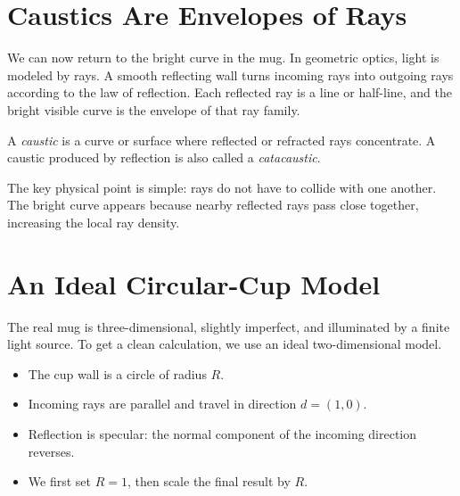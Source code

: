 \documentclass[11pt]{article}
\begin{document}
\section{Caustics Are Envelopes of Rays}

We can now return to the bright curve in the mug. In geometric optics, light is modeled by rays. A smooth reflecting wall turns incoming rays into outgoing rays according to the law of reflection. Each reflected ray is a line or half-line, and the bright visible curve is the envelope of that ray family.

\begin{definitionbox}[title=Caustic]
A \emph{caustic} is a curve or surface where reflected or refracted rays concentrate. A caustic produced by reflection is also called a \emph{catacaustic}.
\end{definitionbox}

The key physical point is simple: rays do not have to collide with one another. The bright curve appears because nearby reflected rays pass close together, increasing the local ray density.

\section{An Ideal Circular-Cup Model}

The real mug is three-dimensional, slightly imperfect, and illuminated by a finite light source. To get a clean calculation, we use an ideal two-dimensional model.

\begin{itemize}
  \item The cup wall is a circle of radius \(R\).
  \item Incoming rays are parallel and travel in direction \(d=(1,0)\).
  \item Reflection is specular: the normal component of the incoming direction reverses.
  \item We first set \(R=1\), then scale the final result by \(R\).
\end{itemize}
\end{document}
